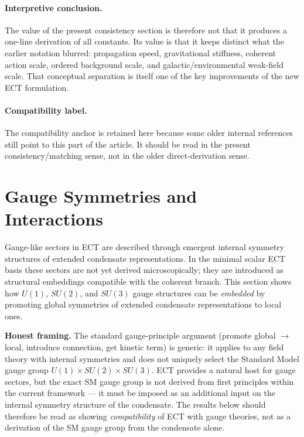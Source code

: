 \documentclass[11pt,a4paper]{article}
\numberwithin{equation}{section}
\begin{document}
\paragraph{Interpretive conclusion.}
The value of the present consistency section is therefore not that it
produces a one-line derivation of all constants.
Its value is that it keeps distinct what the earlier notation blurred:
propagation speed, gravitational stiffness, coherent action scale,
ordered background scale, and galactic/environmental weak-field scale.
That conceptual separation is itself one of the key improvements of the
new ECT formulation.

\paragraph{Compatibility label.}
The compatibility anchor
\label{sec:running_coupling}
is retained here because some older internal references still point to
this part of the article.
It should be read in the present consistency/matching sense, not in the
older direct-derivation sense.
\section{Gauge Symmetries and Interactions}
\label{sec:gauge}

Gauge-like sectors in ECT are described through emergent internal
symmetry structures of extended condensate representations.
In the minimal scalar ECT basis these sectors are not yet derived
microscopically; they are introduced as structural embeddings
compatible with the coherent branch.
This section shows how $U(1)$, $SU(2)$, and $SU(3)$ gauge
structures can be \emph{embedded} by promoting global symmetries
of extended condensate representations to local ones.

\textbf{Honest framing.}
The standard gauge-principle argument (promote global $\to$ local,
introduce connection, get kinetic term) is generic: it applies to any
field theory with internal symmetries and does not uniquely select the
Standard Model gauge group $U(1)\times SU(2)\times SU(3)$.  ECT
provides a natural host for gauge sectors, but the exact SM gauge group
is not derived from first principles within the current framework ---
it must be imposed as an additional input on the internal symmetry
structure of the condensate.  The results below should therefore be
read as showing \emph{compatibility} of ECT with gauge theories, not
as a derivation of the SM gauge group from the condensate alone.
\end{document}

